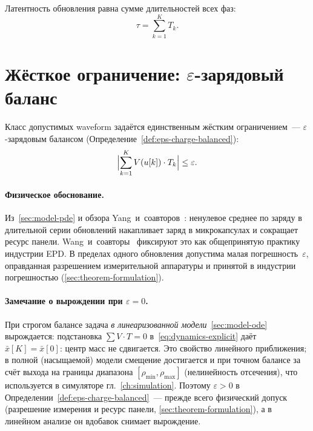 Латентность обновления равна сумме длительностей всех фаз:
\begin{equation}\label{eq:latency}
    \tau = \sum_{k=1}^{K} T_k.
\end{equation}


\section{Жёсткое ограничение: $\varepsilon$-зарядовый баланс}\label{sec:hard-constraint}

Класс допустимых waveform задаётся единственным жёстким ограничением~---
$\varepsilon$-зарядовым балансом (Определение~\ref{def:eps-charge-balanced}):
\begin{equation}\label{eq:hard-constraint}
    \Bigl|\sum_{k=1}^{K} V(u[k]) \cdot T_k\Bigr| \le \varepsilon.
\end{equation}

\paragraph{Физическое обоснование.} Из~\ref{sec:model-pde} и обзора
Yang~и~соавторов~\cite{yang2021_mechanisms}: ненулевое среднее по заряду в
длительной серии обновлений накапливает заряд в микрокапсулах и сокращает
ресурс панели. Wang~и~соавторы~\cite{wang2022_red_ghost} фиксируют это как
общепринятую практику индустрии EPD. В пределах одного
обновления допустима малая погрешность~$\varepsilon$, оправданная разрешением
измерительной аппаратуры и принятой в индустрии погрешностью
(\ref{sec:theorem-formulation}).

\paragraph{Замечание о вырождении при $\varepsilon = 0$.} При строгом балансе
задача \emph{в линеаризованной модели}~\ref{sec:model-ode}
вырождается: подстановка $\sum V \cdot T = 0$ в~\eqref{eq:dynamics-explicit}
даёт $\bar{x}[K] = \bar{x}[0]$: центр масс не сдвигается. Это свойство
линейного приближения; в полной (насыщаемой) модели
смещение достигается и при точном балансе за счёт выхода на границы диапазона
$[\rho_{\min}, \rho_{\max}]$ (нелинейность отсечения), что используется в
симуляторе гл.~\ref{ch:simulation}. Поэтому $\varepsilon > 0$ в
Определении~\ref{def:eps-charge-balanced}~--- прежде всего физический допуск
(разрешение измерения и ресурс панели, \ref{sec:theorem-formulation}), а в
линейном анализе он вдобавок снимает вырождение.

